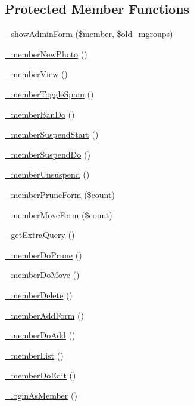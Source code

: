 \subsection*{Protected Member Functions}
\begin{DoxyCompactItemize}
\item 
\hyperlink{classadmin__members__members__members_a4c99456ac898187934d6d83410f2805e}{\-\_\-show\-Admin\-Form} (\$member, \$old\-\_\-mgroups)
\item 
\hyperlink{classadmin__members__members__members_a74f7a20dbb525e1ddd9b09d9645eae96}{\-\_\-member\-New\-Photo} ()
\item 
\hyperlink{classadmin__members__members__members_a1d10c6ca516165ce2ae94d7e023798a6}{\-\_\-member\-View} ()
\item 
\hyperlink{classadmin__members__members__members_ad8c7e94e96725f9177189d49a005e994}{\-\_\-member\-Toggle\-Spam} ()
\item 
\hyperlink{classadmin__members__members__members_a32efe4fc5ba97b39a338ae7abbf8e2c3}{\-\_\-member\-Ban\-Do} ()
\item 
\hyperlink{classadmin__members__members__members_a2ff113153de9dadc8806b7672cf301c6}{\-\_\-member\-Suspend\-Start} ()
\item 
\hyperlink{classadmin__members__members__members_a79b93860455401ebf99a2e09b1d158a1}{\-\_\-member\-Suspend\-Do} ()
\item 
\hyperlink{classadmin__members__members__members_a78baf8bb28644d6e49240e7c62592251}{\-\_\-member\-Unsuspend} ()
\item 
\hyperlink{classadmin__members__members__members_ab56f0fc8d508210a5719d408a30d3773}{\-\_\-member\-Prune\-Form} (\$count)
\item 
\hyperlink{classadmin__members__members__members_a074a08ec70759742b3ea40716defcbdd}{\-\_\-member\-Move\-Form} (\$count)
\item 
\hyperlink{classadmin__members__members__members_a704a5efd3787e102952eebc7c7874780}{\-\_\-get\-Extra\-Query} ()
\item 
\hyperlink{classadmin__members__members__members_acb9dfa44075a78b830e51b34b5c8cf7c}{\-\_\-member\-Do\-Prune} ()
\item 
\hyperlink{classadmin__members__members__members_a471fbf7a094163fda1ec81ce46d5252e}{\-\_\-member\-Do\-Move} ()
\item 
\hyperlink{classadmin__members__members__members_a5dcbd5872737402e26154781b910afb3}{\-\_\-member\-Delete} ()
\item 
\hyperlink{classadmin__members__members__members_a9d8349f866588ee4d69a58dd7870db8f}{\-\_\-member\-Add\-Form} ()
\item 
\hyperlink{classadmin__members__members__members_accf3e2a536768edc9e01217e8d6f2c23}{\-\_\-member\-Do\-Add} ()
\item 
\hyperlink{classadmin__members__members__members_ae1f202d32de76759bdeb2a5386a35e26}{\-\_\-member\-List} ()
\item 
\hyperlink{classadmin__members__members__members_aeda05c501a5bb165e411d95266dea097}{\-\_\-member\-Do\-Edit} ()
\item 
\hyperlink{classadmin__members__members__members_a45d186341f2ed6b9688a7964a51590ef}{\-\_\-login\-As\-Member} ()
\end{DoxyCompactItemize}
